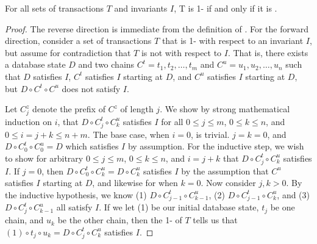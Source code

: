 \begin{theorem}\label{thm:one-is-enough}
  For all sets of transactions $T$ and invariants $I$, T is 1-\iconfluent{} if
  and only if it is \iconfluent{}.
\end{theorem}
\begin{proof}
  The reverse direction is immediate from the definition of \iconfluence{}. For
  the forward direction, consider a set of transactions $T$ that is
  1-\iconfluent{} with respect to an invariant $I$, but assume for
  contradiction that $T$ is not \iconfluent{} with respect to $I$. That is,
  there exists a database state $D$ and two chains $C^t = t_1, t_2, \ldots,
  t_m$ and $C^u = u_1, u_2, \ldots, u_n$ such that $D$ satisfies $I$,
  $C^t$ satisfies $I$ starting at $D$, and $C^u$ satisfies $I$ starting at $D$,
  but $D \circ C^t \circ C^u$ does not satisfy $I$.

  Let $C^z_j$ denote the prefix of $C^z$ of length $j$. We show by strong
  mathematical induction on $i$, that $D \circ C^t_j \circ C^u_k$ satisfies $I$
  for all $0 \leq j \leq m$, $0 \leq k \leq n$, and $0 \leq i = j + k \leq n +
  m$.
  The base case, when $i = 0$, is trivial. $j = k = 0$, and $D \circ C^t_0
  \circ C^u_0 = D$ which satisfies $I$ by assumption.
  For the inductive step, we wish to show for arbitrary $0 \leq j \leq m$, $0
  \leq k \leq n$, and $i = j + k$ that $D \circ C^t_j \circ C^u_k$ satisfies
  $I$. If $j = 0$, then $D \circ C^t_0 \circ C^u_k = D \circ C^u_k$ satisfies
  $I$ by the assumption that $C^u$ satisfies $I$ starting at $D$, and likewise
  for when $k = 0$. Now consider $j, k > 0$. By the inductive hypothesis, we
  know
    (1) $D \circ C^t_{j-1} \circ C^u_{k-1}$,
    (2) $D \circ C^t_{j-1} \circ C^u_{k}$, and
    (3) $D \circ C^t_{j}   \circ C^u_{k-1}$
  all satisfy $I$. If we let (1) be our initial database state, $t_j$ be one
  chain, and $u_k$ be the other chain, then the 1-\iconfluence{} of $T$ tells
  us that $(1) \circ t_j \circ u_k = D \circ C^t_j \circ C^u_k$ satisfies
  $I$.
\end{proof}

\newcommand{\baseedges}{
  \begin{scope}[on background layer]
    \draw[txn] (03) -- (13) node[midway, above]{$u_1$};
    \draw[txn] (13) -- (23) node[midway, above]{$u_2$};
    \draw[txn] (23) -- (33) node[midway, above]{$u_3$};
    \draw[txn] (03) -- (02) node[midway, left]{$t_1$};
    \draw[txn] (02) -- (01) node[midway, left]{$t_2$};
    \draw[txn] (01) -- (00) node[midway, left]{$t_3$};
    \draw[dtxn] (00) -- (30);
    \draw[dtxn] (33) -- (30);
  \end{scope}
}

